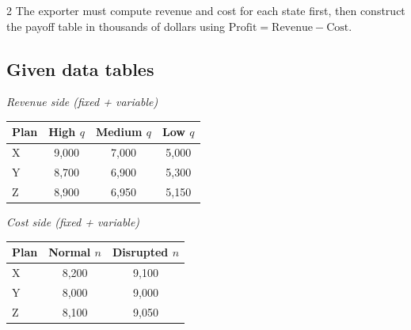 \documentclass[12pt]{article}
\begin{document}
\begin{multicols}{2}
				The exporter must compute revenue and cost for each state first, then construct the payoff table in thousands of dollars using
				\(\text{Profit}=\text{Revenue}-\text{Cost}\).
				\subsection*{Given data tables}
				\begin{center}
					\textit{Revenue side (fixed + variable)}
					\begin{center}
						\begin{tabular}{l c c c}
							\toprule
							Plan & High $q$ & Medium $q$ & Low $q$ \\
							\midrule
							X & 9{,}000 & 7{,}000 & 5{,}000 \\
							Y & 8{,}700 & 6{,}900 & 5{,}300 \\
							Z & 8{,}900 & 6{,}950 & 5{,}150 \\
							\bottomrule
						\end{tabular}
					\end{center}
					
					\vspace{0.5cm}
					
					\textit{Cost side (fixed + variable)}
					\begin{center}
						\begin{tabular}{l c c}
							\toprule
							Plan & Normal $n$ & Disrupted $n$ \\
							\midrule
							X & 8{,}200 & 9{,}100 \\
							Y & 8{,}000 & 9{,}000 \\
							Z & 8{,}100 & 9{,}050 \\
							\bottomrule
						\end{tabular}
					\end{center}
				\end{center}
	\end{multicols}
\end{document}

